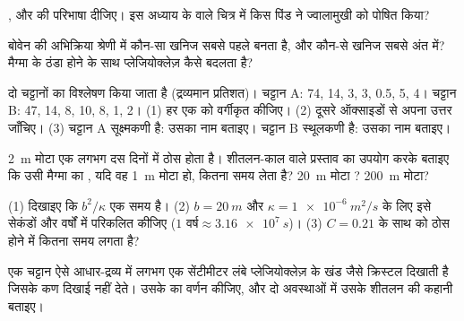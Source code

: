 \begin{exercise}[$\star$]\label{exo:g11:igneous-rocks:4}
,  और  की परिभाषा दीजिए। इस अध्याय के  वाले
चित्र में किस पिंड ने ज्वालामुखी को पोषित किया?
\end{exercise}

\begin{exercise}[$\star$]\label{exo:g11:igneous-rocks:5}
बोवेन की अभिक्रिया श्रेणी में कौन-सा खनिज सबसे पहले बनता है, और कौन-से खनिज
सबसे अंत में? मैग्मा के ठंडा होने के साथ प्लेजियोक्लेज़ कैसे बदलता है?
\end{exercise}

\begin{exercise}[$\star\star$]\label{exo:g11:igneous-rocks:6}
दो चट्टानों का विश्लेषण किया जाता है (द्रव्यमान प्रतिशत)। चट्टान A:  74, 
14,  3,  3,  0.5,  5,  4। चट्टान B:
 47,  14,  8,  10,  8, 
1,  2। (1) हर एक को वर्गीकृत कीजिए। (2) दूसरे ऑक्साइडों से अपना उत्तर
जाँचिए। (3) चट्टान A सूक्ष्मकणी है: उसका नाम बताइए। चट्टान B स्थूलकणी है: उसका नाम
बताइए।
\end{exercise}

\begin{exercise}[$\star\star$]\label{exo:g11:igneous-rocks:7}
\qty{2}{m} मोटा एक  लगभग दस दिनों में ठोस होता है। शीतलन-काल वाले
प्रस्ताव का उपयोग करके बताइए कि उसी मैग्मा का , यदि वह
\qty{1}{m} मोटा हो, कितना समय लेता है? \qty{20}{m} मोटा ? \qty{200}{m} मोटा?
\end{exercise}

\begin{exercise}[$\star\star$]\label{exo:g11:igneous-rocks:8}
(1) दिखाइए कि $b^2/\kappa$ एक समय है। (2) $b = \qty{20}{m}$
और $\kappa = \qty{1e-6}{m^2/s}$ के लिए इसे सेकंडों और वर्षों में परिकलित कीजिए
($\num{1}\text{ वर्ष} \approx \qty{3.16e7}{s}$)। (3) $C = 0.21$ के साथ  को
ठोस होने में कितना समय लगता है?
\end{exercise}

\begin{exercise}[$\star\star$]\label{exo:g11:igneous-rocks:9}
एक चट्टान ऐसे आधार-द्रव्य में लगभग एक सेंटीमीटर लंबे प्लेजियोक्लेज़ के खंड जैसे क्रिस्टल
दिखाती है जिसके कण दिखाई नहीं देते। उसके  का वर्णन कीजिए, और
दो अवस्थाओं में उसके शीतलन की कहानी बताइए।
\end{exercise}


